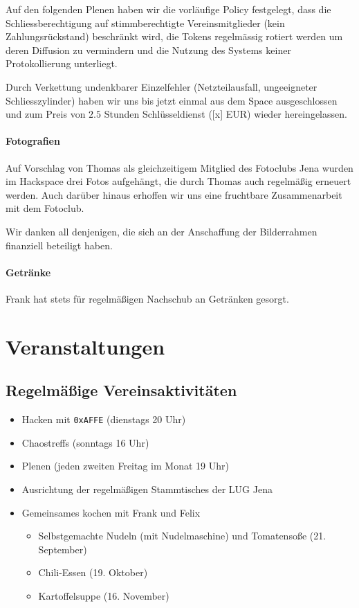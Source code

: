 \documentclass[10pt,DIV16]{scrartcl}
\begin{document}
Auf den folgenden Plenen haben wir die vorl\"aufige Policy festgelegt,
dass die Schliessberechtigung auf stimmberechtigte Vereinsmitglieder
(kein Zahlungsr\"uckstand) beschr\"ankt wird, die Tokens regelm\"assig
rotiert werden um deren Diffusion zu vermindern und die Nutzung des
Systems keiner Protokollierung unterliegt.

Durch Verkettung undenkbarer Einzelfehler (Netzteilausfall,
ungeeigneter Schliesszylinder) haben wir uns bis jetzt einmal aus dem
Space ausgeschlossen und zum Preis von $2.5$ Stunden Schl\"usseldienst
([x] EUR) wieder hereingelassen.

\paragraph{Fotografien}

Auf Vorschlag von Thomas als gleichzeitigem Mitglied des Fotoclubs Jena wurden
im Hackspace drei Fotos aufgehängt, die durch Thomas auch regelmäßig erneuert
werden.  Auch darüber hinaus erhoffen wir uns eine fruchtbare Zusammenarbeit
mit dem Fotoclub.

Wir danken all denjenigen, die sich an der Anschaffung der Bilderrahmen
finanziell beteiligt haben.

\paragraph{Getränke}

Frank hat stets für regelmäßigen Nachschub an Getränken gesorgt.

\section{Veranstaltungen}

\subsection{Regelmäßige Vereinsaktivitäten}

\begin{itemize}
	\item Hacken mit \texttt{0xAFFE} (dienstags 20 Uhr)
	\item Chaostreffs (sonntags 16 Uhr)
	\item Plenen (jeden zweiten Freitag im Monat 19 Uhr)
	\item Ausrichtung der regelmäßigen Stammtisches der LUG Jena
	\item Gemeinsames kochen mit Frank und Felix
		\begin{itemize}
			\item Selbstgemachte Nudeln (mit Nudelmaschine) und 
				Tomatensoße (21. September)
			\item Chili-Essen (19. Oktober)
			\item Kartoffelsuppe (16. November)
		\end{itemize}
\end{itemize}
\end{document}
